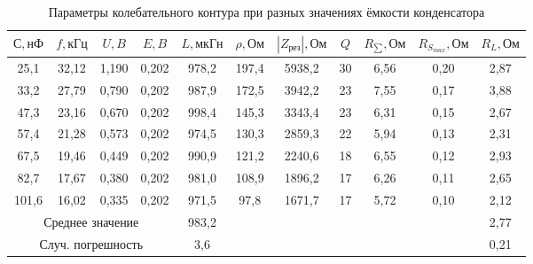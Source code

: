 \documentclass[a4paper, 12pt]{article}
\begin{document}
\begin{table}[h!]
\begin{center}
\begin{tabular}{|cccc|c|c|c|c|c|c|c|}
\hline
\multicolumn{1}{|c|}{$С, нФ$} & \multicolumn{1}{c|}{$f, кГц$} & \multicolumn{1}{c|}{$U, B$}  & $E, B$  & $L, мкГн$ & $\rho, Ом$ & $|Z_{рез}|, Ом$ & $Q$  & $R_{\sum}, Ом$ & $R_{S_{max}}, Ом$ & $R_L, Ом$ \\ \hline
\multicolumn{1}{|c|}{25,1}  & \multicolumn{1}{c|}{32,12}  & \multicolumn{1}{c|}{1,190} & 0,202 & 978,2   & 197,4   & 5938,2     & 30 & 6,56     & 0,20      & 2,87     \\ \hline
\multicolumn{1}{|c|}{33,2}  & \multicolumn{1}{c|}{27,79}  & \multicolumn{1}{c|}{0,790} & 0,202 & 987,9   & 172,5   & 3942,2     & 23 & 7,55     & 0,17      & 3,88     \\ \hline
\multicolumn{1}{|c|}{47,3}  & \multicolumn{1}{c|}{23,16}  & \multicolumn{1}{c|}{0,670} & 0,202 & 998,4   & 145,3   & 3343,4     & 23 & 6,31     & 0,15      & 2,67     \\ \hline
\multicolumn{1}{|c|}{57,4}  & \multicolumn{1}{c|}{21,28}  & \multicolumn{1}{c|}{0,573} & 0,202 & 974,5   & 130,3   & 2859,3     & 22 & 5,94     & 0,13      & 2,31     \\ \hline
\multicolumn{1}{|c|}{67,5}  & \multicolumn{1}{c|}{19,46}  & \multicolumn{1}{c|}{0,449} & 0,202 & 990,9   & 121,2   & 2240,6     & 18 & 6,55     & 0,12      & 2,93     \\ \hline
\multicolumn{1}{|c|}{82,7}  & \multicolumn{1}{c|}{17,67}  & \multicolumn{1}{c|}{0,380} & 0,202 & 981,0   & 108,9   & 1896,2     & 17 & 6,26     & 0,11      & 2,65     \\ \hline
\multicolumn{1}{|c|}{101,6} & \multicolumn{1}{c|}{16,02}  & \multicolumn{1}{c|}{0,335} & 0,202 & 971,5   & 97,8    & 1671,7     & 17 & 5,72     & 0,10      & 2,12     \\ \hline
\multicolumn{4}{|c|}{Среднее значение}                                                         & 983,2   &         &            &    &          &           & 2,77     \\ \hline
\multicolumn{4}{|c|}{Случ. погрешность}                                                        & 3,6     &         &            &    &          &           & 0,21     \\ \hline
\end{tabular}
\end{center}
\caption{Параметры колебательного контура при разных значениях ёмкости конденсатора}
\label{tab1}
\end{table}
\end{document}
